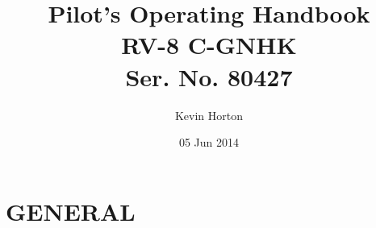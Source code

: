 \title{Pilot's Operating Handbook\\
[1in]RV-8 C-GNHK\\
[0.25in]Ser. No. 80427}

\author{Kevin Horton}

\date{05 Jun 2014}

\maketitle \clearpage

\cleardoublepage \setcounter{tocdepth}{0} 

\tableofcontents{}

\clearpage

\mainmatter

\chapter{GENERAL} \vspace{\minitocspacebefore} \minitoc \clearpage


